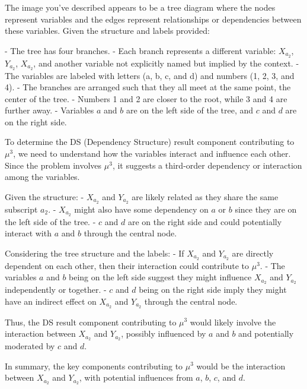 The image you've described appears to be a tree diagram where the nodes represent variables and the edges represent relationships or dependencies between these variables. Given the structure and labels provided:

- The tree has four branches.
- Each branch represents a different variable: \(X_{a_2}\), \(Y_{a_2}\), \(X_{a_2}\), and another variable not explicitly named but implied by the context.
- The variables are labeled with letters (a, b, c, and d) and numbers (1, 2, 3, and 4).
- The branches are arranged such that they all meet at the same point, the center of the tree.
- Numbers 1 and 2 are closer to the root, while 3 and 4 are further away.
- Variables \(a\) and \(b\) are on the left side of the tree, and \(c\) and \(d\) are on the right side.

To determine the DS (Dependency Structure) result component contributing to \(\mu^3\), we need to understand how the variables interact and influence each other. Since the problem involves \(\mu^3\), it suggests a third-order dependency or interaction among the variables.

Given the structure:
- \(X_{a_2}\) and \(Y_{a_2}\) are likely related as they share the same subscript \(a_2\).
- \(X_{a_2}\) might also have some dependency on \(a\) or \(b\) since they are on the left side of the tree.
- \(c\) and \(d\) are on the right side and could potentially interact with \(a\) and \(b\) through the central node.

Considering the tree structure and the labels:
- If \(X_{a_2}\) and \(Y_{a_2}\) are directly dependent on each other, then their interaction could contribute to \(\mu^3\).
- The variables \(a\) and \(b\) being on the left side suggest they might influence \(X_{a_2}\) and \(Y_{a_2}\) independently or together.
- \(c\) and \(d\) being on the right side imply they might have an indirect effect on \(X_{a_2}\) and \(Y_{a_2}\) through the central node.

Thus, the DS result component contributing to \(\mu^3\) would likely involve the interaction between \(X_{a_2}\) and \(Y_{a_2}\), possibly influenced by \(a\) and \(b\) and potentially moderated by \(c\) and \(d\).

In summary, the key components contributing to \(\mu^3\) would be the interaction between \(X_{a_2}\) and \(Y_{a_2}\), with potential influences from \(a\), \(b\), \(c\), and \(d\).